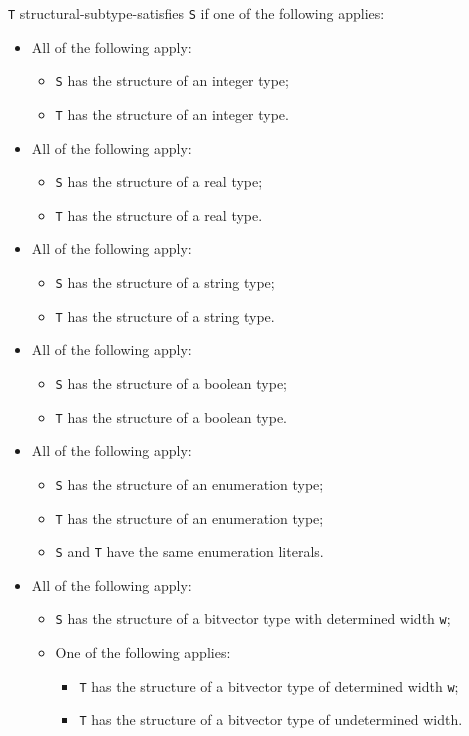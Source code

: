 \documentclass{book}
\begin{document}
  \texttt{T} structural-subtype-satisfies \texttt{S} if one of the following applies:
  \begin{itemize}
  \item All of the following apply:
    \begin{itemize}
    \item \texttt{S} has the structure of an integer type;
    \item \texttt{T} has the structure of an integer type.
    \end{itemize}

  \item All of the following apply:
    \begin{itemize}
    \item \texttt{S} has the structure of a real type;
    \item \texttt{T} has the structure of a real type.
    \end{itemize} 

  \item All of the following apply:
    \begin{itemize}
    \item \texttt{S} has the structure of a string type;
    \item \texttt{T} has the structure of a string type.
    \end{itemize}

  \item All of the following apply:
    \begin{itemize}
    \item \texttt{S} has the structure of a boolean type;
    \item \texttt{T} has the structure of a boolean type.
    \end{itemize}

  \item All of the following apply:
    \begin{itemize}
    \item \texttt{S} has the structure of an enumeration type; 
    \item \texttt{T} has the structure of an enumeration type;
    \item \texttt{S} and \texttt{T} have the same enumeration literals.
    \end{itemize}

  \item All of the following apply:
    \begin{itemize}
    \item \texttt{S} has the structure of a bitvector type with determined width \texttt{w};
    \item One of the following applies:
      \begin{itemize}
      \item \texttt{T} has the structure of a bitvector type of determined width \texttt{w};
      \item \texttt{T} has the structure of a bitvector type of undetermined width.
      \end{itemize}
    \end{itemize}


\end{itemize}
\end{document}
